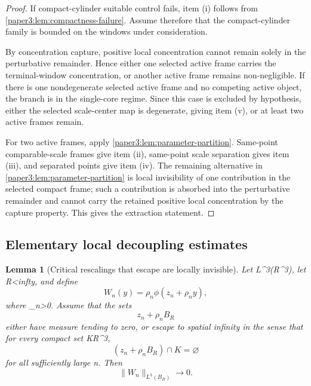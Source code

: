 \documentclass[11pt]{amsart}
\def\({}%
\def\){}%
\def\mathbb#1{#1}%
\def\infty{infty}%
\theoremstyle{plain}
\newtheorem{lemma}[theorem]{Lemma}
\theoremstyle{definition}
\theoremstyle{remark}
\begin{document}
\begin{proof}
If compact-cylinder suitable control fails, item \((i)\) follows from
\cref{paper3:lem:compactness-failure}.  Assume therefore that the compact-cylinder
family is bounded on the windows under consideration.
\par
By concentration capture, positive local concentration cannot remain solely in
the perturbative remainder.  Hence either one selected active frame carries the
terminal-window concentration, or another active frame remains non-negligible.
If there is one nondegenerate selected active frame and no competing active
object, the branch is in the single-core regime.  Since this case is
excluded by hypothesis, either the selected scale-center map is degenerate,
giving item \((v)\), or at least two active frames remain.
\par
For two active frames, apply \cref{paper3:lem:parameter-partition}.  Same-point
comparable-scale frames give item \((ii)\), same-point scale separation gives
item \((iii)\), and separated points give item \((iv)\).  The remaining
alternative in \cref{paper3:lem:parameter-partition} is local invisibility of one
contribution in the selected compact frame; such a contribution is absorbed
into the perturbative remainder and cannot carry the retained positive local
concentration by the capture property.  This gives the extraction statement.
\end{proof}

\subsection{Elementary local decoupling estimates}

\begin{lemma}[Critical rescalings that escape are locally invisible]\label{paper3:lem:escaping-l3}
Let \(\phi\in L^3(\mathbb R^3)\), let \(R<\infty\), and define
\[
  W_n(y)=\rho_n\phi(z_n+\rho_n y),
\]
where \(\rho_n>0\).  Assume that the sets
\[
  z_n+\rho_nB_R
\]
either have measure tending to zero, or escape to spatial infinity in the sense
that for every compact set \(K\subset\mathbb R^3\),
\[
  (z_n+\rho_nB_R)\cap K=\varnothing
\]
for all sufficiently large \(n\).  Then
\[
  \|W_n\|_{L^3(B_R)}\to0.
\]
\end{lemma}
\end{document}
